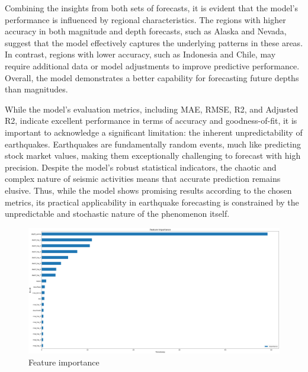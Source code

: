 Combining the insights from both sets of forecasts, it is evident
that the model's performance is influenced by regional characteristics.
The regions with higher accuracy in both magnitude and depth forecasts,
such as Alaska and Nevada, suggest that the model effectively captures
the underlying patterns in these areas. In contrast, regions with lower
accuracy, such as Indonesia and Chile, may require additional data or
model adjustments to improve predictive performance. Overall, the
model demonstrates a better capability for forecasting future depths than magnitudes.

While the model's evaluation metrics, including \ac{MAE}, \ac{RMSE}, R2, and Adjusted R2,
indicate excellent performance in terms of accuracy and goodness-of-fit,
it is important to acknowledge a significant limitation: the inherent
unpredictability of earthquakes. Earthquakes are fundamentally random
events, much like predicting stock market values, making them
exceptionally challenging to forecast with high precision. Despite
the model's robust statistical indicators, the chaotic and complex
nature of seismic activities means that accurate prediction remains
elusive. Thus, while the model shows promising results according to
the chosen metrics, its practical applicability in earthquake
forecasting is constrained by the unpredictable and stochastic
nature of the phenomenon itself.

\begin{figure}[hbtp]
  \centering
  \includegraphics[scale=0.18]{img/model-feature-importance.png}
  \captionsetup{format=hang}
  \caption{\label{fig:feature-importance}Feature importance}
\end{figure}

